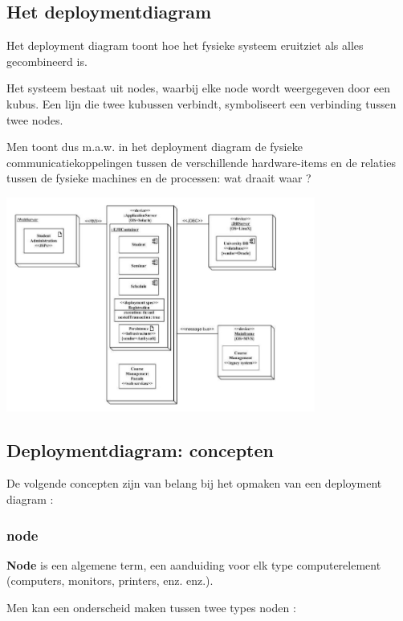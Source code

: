 
\subsection{Het deploymentdiagram}

Het deployment diagram toont hoe het fysieke systeem eruitziet als alles gecombineerd is.

Het systeem bestaat uit nodes, waarbij elke node wordt weergegeven door een kubus. Een lijn die twee kubussen verbindt, symboliseert een verbinding tussen twee nodes.

Men toont dus m.a.w. in het deployment diagram de fysieke communicatiekoppelingen tussen de verschillende hardware-items en de relaties tussen de fysieke machines en de processen: wat draait waar ?



\begin{center}
\includegraphics[width=4in]{img/deployment}%
\end{center}

\subsection{Deploymentdiagram: concepten}

De volgende concepten zijn van belang bij het opmaken van een deployment diagram :

\subsubsection{node}

\textbf{Node} is een algemene term, een aanduiding voor elk type computerelement (computers, monitors, printers, enz. enz.).

Men kan een onderscheid maken tussen twee types noden :

